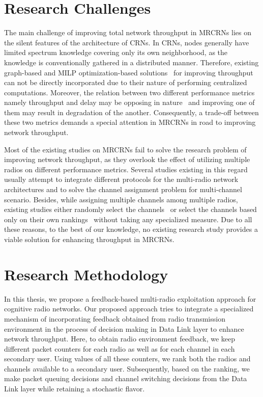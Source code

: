 \section{Research Challenges}
The main challenge of improving total network throughput in MRCRNs lies on the silent features of the architecture of CRNs. In CRNs, nodes generally have limited spectrum knowledge covering only its own neighborhood, as the knowledge is conventionally gathered in a distributed manner. Therefore, existing graph-based and MILP optimization-based solutions~\cite{hoang2008downlink,ahmed2014channel} for improving throughput can not be directly incorporated due to their nature of performing centralized computations. Moreover, the relation between two different performance metrics namely throughput and delay may be opposing in nature~\cite{gamal2004throughput} and improving one of them may result in degradation of the another. Consequently, a trade-off between these two metrics demands a special attention in MRCRNs in road to improving network throughput.

Most of the existing studies on MRCRNs fail to solve the research problem of improving network throughput, as they overlook the effect of utilizing multiple radios on different performance metrics. Several studies existing in this regard~\cite{de2012survey, feng2009joint, zhong2014capacity, li2014deterministic} usually attempt to integrate different protocols for the multi-radio network architectures and to solve the channel assignment problem for multi-channel scenario. Besides, while assigning multiple channels among multiple radios, existing studies either randomly select the channels~\cite{khan2015towards} or select the channels based only on their own rankings~\cite{zhong2014capacity} without taking any specialized measure. Due to all these reasons, to the best of our knowledge, no existing research study provides a viable solution for enhancing throughput in MRCRNs.

\section{Research Methodology}
In this thesis, we propose a feedback-based multi-radio exploitation approach for cognitive radio networks. Our proposed approach tries to integrate a specialized mechanism of incorporating feedback obtained from radio transmission environment in the process of decision making in Data Link layer to enhance network throughput. Here, to obtain radio environment feedback, we keep different packet counters for each radio as well as for each channel in each secondary user. Using values of all these counters, we rank both the radios and channels available to a secondary user. Subsequently, based on the ranking, we make packet queuing decisions and channel switching decisions from the Data Link layer while retaining a stochastic flavor.

